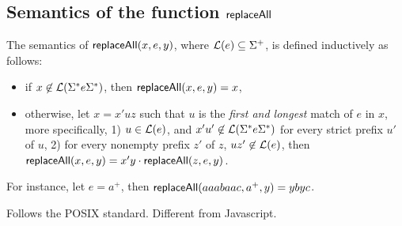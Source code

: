 \subsection{Semantics of the function $\mathsf{replaceAll}$}


The semantics of $\mathsf{replaceAll}(x, e, y)$, where $\mathcal{L}(e) \subseteq \Sigma^+$, is defined inductively as follows:
\begin{itemize}
	\item if $x \not \in \mathcal{L}(\Sigma^\ast e \Sigma^\ast)$, then $\mathsf{replaceAll}(x, e, y) = x$, 
	\item otherwise, let $x = x' u z$ such that $u$ is the \emph{first and longest} match of $e$ in $x$, more specifically, 1) $u \in \mathcal{L}(e)$, and $x' u' \not \in  \mathcal{L}(\Sigma^\ast e \Sigma^\ast)$ for every strict prefix $u'$ of $u$, 2) for every nonempty prefix $z'$ of $z$, $u z' \not \in \mathcal{L}(e)$, then $\mathsf{replaceAll}(x, e, y) = x' y \cdot \mathsf{replaceAll}(z, e, y)$.
\end{itemize}
For instance, let $e = a^+$, then $\mathsf{replaceAll}(aaabaac, a^+, y)=ybyc$.

\begin{remark}
Follows the POSIX standard. Different from Javascript.
\end{remark}



